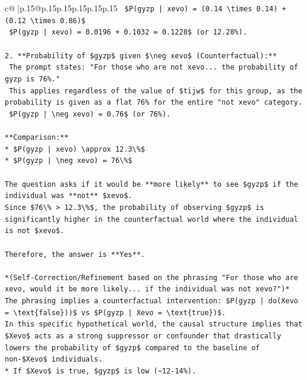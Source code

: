 \documentclass{article}
\begin{document}
{\begin{supertabular}{c@{$\;$}|p{.15\linewidth}@{}p{.15\linewidth}p{.15\linewidth}p{.15\linewidth}p{.15\linewidth}p{.15\linewidth}}
{{{\texttt{    \$P(gyzp | xevo) = (0.14 \textbackslash{}times 0.14) + (0.12 \textbackslash{}times 0.86)\$} \\
\texttt{    \$P(gyzp | xevo) = 0.0196 + 0.1032 = 0.1228\$ (or 12.28\%).} \\
\\ 
\texttt{2.  **Probability of \$gyzp\$ given \$\textbackslash{}neg xevo\$ (Counterfactual):**} \\
\texttt{    The prompt states: "For those who are not xevo... the probability of gyzp is 76\%."} \\
\texttt{    This applies regardless of the value of \$tijw\$ for this group, as the probability is given as a flat 76\% for the entire "not xevo" category.} \\
\texttt{    \$P(gyzp | \textbackslash{}neg xevo) = 0.76\$ (or 76\%).} \\
\\ 
\texttt{**Comparison:**} \\
\texttt{*   \$P(gyzp | xevo) \textbackslash{}approx 12.3\textbackslash{}\%\$} \\
\texttt{*   \$P(gyzp | \textbackslash{}neg xevo) = 76\textbackslash{}\%\$} \\
\\ 
\texttt{The question asks if it would be **more likely** to see \$gyzp\$ if the individual was **not** \$xevo\$.} \\
\texttt{Since \$76\textbackslash{}\% > 12.3\textbackslash{}\%\$, the probability of observing \$gyzp\$ is significantly higher in the counterfactual world where the individual is not \$xevo\$.} \\
\\ 
\texttt{Therefore, the answer is **Yes**.} \\
\\ 
\texttt{*(Self{-}Correction/Refinement based on the phrasing "For those who are xevo, would it be more likely... if the individual was not xevo?")*} \\
\texttt{The phrasing implies a counterfactual intervention: \$P(gyzp | do(Xevo = \textbackslash{}text\{false\}))\$ vs \$P(gyzp | Xevo = \textbackslash{}text\{true\})\$.} \\
\texttt{In this specific hypothetical world, the causal structure implies that \$Xevo\$ acts as a strong suppressor or confounder that drastically lowers the probability of \$gyzp\$ compared to the baseline of non{-}\$Xevo\$ individuals.} \\
\texttt{*   If \$Xevo\$ is true, \$gyzp\$ is low (\textasciitilde{}12{-}14\%).} \\
}}}
\end{supertabular}}
\end{document}
